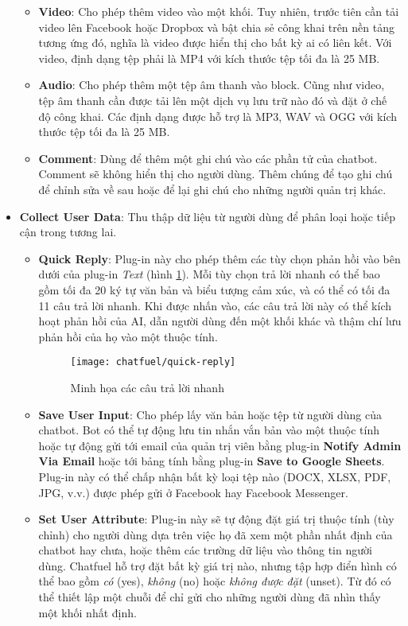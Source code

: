 \begin{itemize}
\begin{itemize}
\begin{figure}[htb!]
		\end{figure}
		\item \textbf{Video}: Cho phép thêm video vào một khối. Tuy nhiên, trước tiên cần tải video lên Facebook hoặc Dropbox và bật chia sẻ công khai trên nền tảng tương ứng đó, nghĩa là video được hiển thị cho bất kỳ ai có liên kết. Với video, định dạng tệp phải là MP4 với kích thước tệp tối đa là 25 MB.
		\item \textbf{Audio}: Cho phép thêm một tệp âm thanh vào block. Cũng như video, tệp âm thanh cần được tải lên một dịch vụ lưu trữ nào đó và đặt ở chế độ công khai. Các định dạng được hỗ trợ là MP3, WAV và OGG với kích thước tệp tối đa là 25 MB.
		\item \textbf{Comment}: Dùng để thêm một ghi chú vào các phần tử của chatbot. Comment sẽ không hiển thị cho người dùng. Thêm chúng để tạo ghi chú để chỉnh sửa về sau hoặc để lại ghi chú cho những người quản trị khác.
	\end{itemize}
	\item \textbf{Collect User Data}: Thu thập dữ liệu từ người dùng để phân loại hoặc tiếp cận trong tương lai. \begin{itemize}
		\item \textbf{Quick Reply}: Plug-in này cho phép thêm các tùy chọn phản hồi vào bên dưới của plug-in \textit{Text} (hình \ref{fig:fig-s3-9-chatfuel-quick-reply}). Mỗi tùy chọn trả lời nhanh có thể bao gồm tối đa 20 ký tự văn bản và biểu tượng cảm xúc, và có thể có tối đa 11 câu trả lời nhanh. Khi được nhấn vào, các câu trả lời này có thể kích hoạt phản hồi của AI, dẫn người dùng đến một khối khác và thậm chí lưu phản hồi của họ vào một thuộc tính.\par
		\begin{figure}[htb!]\centering
			\texttt{[image: chatfuel/quick-reply]}
			\caption{Minh họa các câu trả lời nhanh}
			\label{fig:fig-s3-9-chatfuel-quick-reply}
		\end{figure}
		\item \textbf{Save User Input}: Cho phép lấy văn bản hoặc tệp từ người dùng của chatbot. Bot có thể tự động lưu tin nhắn vắn bản vào một thuộc tính hoặc tự động gửi tới email của quản trị viên bằng plug-in \textbf{Notify Admin Via Email} hoặc tới bảng tính bằng plug-in \textbf{Save to Google Sheets}. Plug-in này có thể chấp nhận bất kỳ loại tệp nào (DOCX, XLSX, PDF, JPG, v.v.) được phép gửi ở Facebook hay Facebook Messenger.
		\item \textbf{Set User Attribute}: Plug-in này sẽ tự động đặt giá trị thuộc tính (tùy chỉnh) cho người dùng dựa trên việc họ đã xem một phần nhất định của chatbot hay chưa, hoặc thêm các trường dữ liệu vào thông tin người dùng. Chatfuel hỗ trợ đặt bất kỳ giá trị nào, nhưng tập hợp điển hình có thể bao gồm \textit{có} (yes), \textit{không} (no) hoặc \textit{không được đặt} (unset). Từ đó có thể thiết lập một chuỗi để chỉ gửi cho những người dùng đã nhìn thấy một khối nhất định.

\end{itemize}
\end{itemize}
